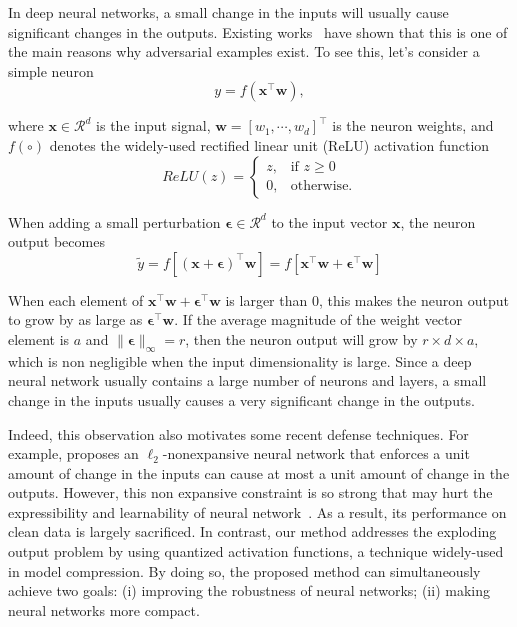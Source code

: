 \documentclass{article}
\def \x{\mathbf{x}}
\def \w{\mathbf{w}}
\def \R{\mathcal{R}}
\begin{document}
In deep neural networks, a small change in the inputs will usually cause significant changes in the outputs. Existing works~\cite{qian2018l2,goodfellow2014explaining} have shown that this is one of the main reasons why adversarial examples exist. To see this, let's consider a simple neuron 
\begin{equation}
y=f(\x^\top\w),   
\end{equation}

where $\x\in \R^d$ is the input signal, $\w=[w_1,\cdots,w_d]^\top$ is the neuron weights, and $f(\circ)$ denotes the widely-used rectified linear unit (ReLU) activation function
\begin{equation}{ReLU(z)}=
\begin{cases}
    z,& \text{if } z \geq 0\\
    0,          & \text{otherwise}.
\end{cases}
\end{equation}

\noindent When adding a small perturbation $\boldsymbol{\epsilon}\in \R^d$ to the input vector $\x$, the neuron output becomes 
\begin{equation}
\tilde y=f[(\x+\boldsymbol{\epsilon})^\top\w]=f[\x^\top\w+\boldsymbol{\epsilon}^\top\w]  
\end{equation}

When each element of $\x^\top\w+\boldsymbol{\epsilon}^\top\w$ is larger than 0, this makes the neuron output to grow by as large as $\boldsymbol{\epsilon}^\top\w$. If the average magnitude of the weight vector element is $a$ and $\|\boldsymbol{\epsilon}\|_\infty= r$, then the neuron output will grow by $r\times d\times a$, which is non negligible when the input dimensionality is large. Since a deep neural network usually contains a large number of neurons and layers, a small change in the inputs usually causes a very significant change in the outputs. 

Indeed, this observation also  motivates some recent defense techniques. For example, \cite{qian2018l2} proposes an $\ell_2$-nonexpansive neural network that enforces a unit amount of change in the inputs can cause at most a unit amount of change in the outputs. However, this non expansive constraint is so strong that may hurt the expressibility and learnability of neural network~\cite{lin2017does}. As a result, its performance on clean data is largely sacrificed. In contrast, our method addresses the exploding output problem by using quantized activation functions, a technique widely-used in model compression. By doing so, the proposed method can simultaneously achieve two goals: (i) improving the robustness of neural networks; (ii) making neural networks more compact. 
\end{document}
